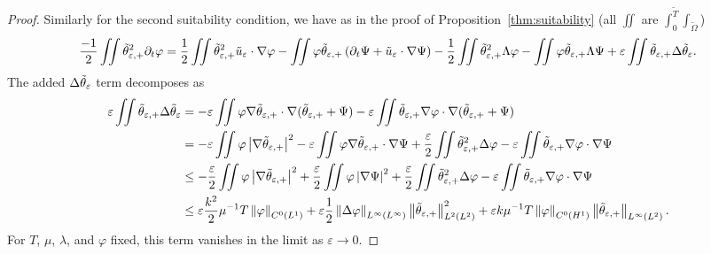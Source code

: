 \documentclass[11pt]{amsart}
\theoremstyle{remark}
\theoremstyle{definition}
\newcommand{\eps}{\varepsilon}
\newcommand{\norm}[1]{\left\lVert#1\right\rVert}
\newcommand{\paren}[1]{\left( #1 \right)}
\newcommand{\abs}[1]{\left\lvert #1 \right\rvert}
\newcommand{\del}{\partial}
\newcommand{\grad}{\nabla}
\newcommand{\Laplace}{\Delta}
\newcommand{\n}{^{-1}}
\begin{document}
\begin{proof}
Similarly for the second suitability condition, we have as in the proof of Proposition~\ref{thm:suitability} (all $\iint$ are $\int_0^{\tilde{T}} \int_{\tilde{\Omega}}$)
\[ \frac{-1}{2} \iint \thetaep^2 \del_t \varphi = \frac{1}{2} \iint \thetaep^2 \ue \cdot \grad\varphi - \iint \varphi \thetaep \paren{\del_t \Psi + \ue \cdot\grad\Psi} - \frac{1}{2} \iint \thetaep^2 \Lambda \varphi - \iint \varphi \thetaep \Lambda\Psi + \eps \iint \thetaep \Laplace \thetae. \]
The added $\Laplace \thetae$ term decomposes as
\[ \begin{aligned} 
\eps \iint \thetaep \Laplace \thetae &= -\eps \iint \varphi \grad \thetaep \cdot \grad (\thetaep + \Psi) - \eps \iint \thetaep \grad \varphi \cdot \grad (\thetaep + \Psi)
\\ &= -\eps \iint \varphi \abs{\grad \thetaep}^2 - \eps \iint \varphi \grad \thetaep \cdot \grad \Psi + \frac{\eps}{2} \iint \thetaep^2 \Laplace \varphi - \eps \iint \thetaep \grad\varphi \cdot \grad \Psi
\\ &\leq - \frac{\eps}{2} \iint \varphi \abs{\grad\thetaep}^2 + \frac{\eps}{2} \iint \varphi \abs{\grad\Psi}^2 + \frac{\eps}{2} \iint \thetaep^2 \Laplace \varphi - \eps \iint \thetaep \grad\varphi \cdot \grad \Psi
\\ &\leq \eps \frac{k^2}{2} \mu\n T \norm{\varphi}_{C^0(L^1)} + \eps \frac{1}{2}\norm{\Laplace \varphi}_{L^\infty(L^\infty)} \norm{\thetaep}_{L^2(L^2)}^2 + \eps k \mu\n T \norm{\varphi}_{C^0(H^1)} \norm{\thetaep}_{L^\infty(L^2)}.
\end{aligned} \]
For $T$, $\mu$, $\lambda$, and $\varphi$ fixed, this term vanishes in the limit as $\eps \to 0$.  


\end{proof}
\end{document}
